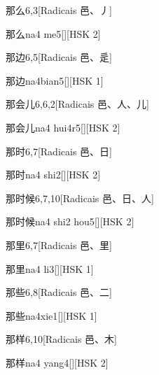 \begin{entry}{那么}{6,3}[Radicais ⾢、⼃]
  \begin{phonetics}{那么}{na4 me5}[][HSK 2]
  \end{phonetics}
\end{entry}

\begin{entry}{那边}{6,5}[Radicais ⾢、⾡]
  \begin{phonetics}{那边}{na4bian5}[][HSK 1]
  \end{phonetics}
\end{entry}

\begin{entry}{那会儿}{6,6,2}[Radicais ⾢、⼈、⼉]
  \begin{phonetics}{那会儿}{na4 hui4r5}[][HSK 2]
  \end{phonetics}
\end{entry}

\begin{entry}{那时}{6,7}[Radicais ⾢、⽇]
  \begin{phonetics}{那时}{na4 shi2}[][HSK 2]
  \end{phonetics}
\end{entry}

\begin{entry}{那时候}{6,7,10}[Radicais ⾢、⽇、⼈]
  \begin{phonetics}{那时候}{na4 shi2 hou5}[][HSK 2]
  \end{phonetics}
\end{entry}

\begin{entry}{那里}{6,7}[Radicais ⾢、⾥]
  \begin{phonetics}{那里}{na4 li3}[][HSK 1]
  \end{phonetics}
\end{entry}

\begin{entry}{那些}{6,8}[Radicais ⾢、⼆]
  \begin{phonetics}{那些}{na4xie1}[][HSK 1]
  \end{phonetics}
\end{entry}

\begin{entry}{那样}{6,10}[Radicais ⾢、⽊]
  \begin{phonetics}{那样}{na4 yang4}[][HSK 2]
  \end{phonetics}
\end{entry}

